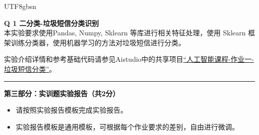 \documentclass[a4paper, 11pt]{article}
\newenvironment{problem}[2][Q]
    { \begin{mdframed}[backgroundcolor=gray!20] \textbf{#1 #2} \\}
    {  \end{mdframed}}
\begin{document}
\begin{CJK}{UTF8}{gbsn}
\begin{problem}{1 二分类-垃圾短信分类识别}
本实验要求使用Pandas, Numpy, Sklearn 等库进行相关特征处理，使用 Sklearn 框架训练分类器，使用机器学习的方法对垃圾短信进行分类。

实验介绍详情和参考基础代码请参见Aistudio中的共享项目\href{https://aistudio.baidu.com/studio/project/partial/verify/7582660/d72871e3eb6146cfb4d9fdafa4ca3116}{“人工智能课程-作业一-垃圾短信分类”}。

\end{problem}

\noindent\rule{7in}{1pt}
\textbf{第三部分：实训题实验报告（共2分）}
\begin{itemize}
    \item 请按照实验报告模板完成实验报告。
    \item 实验报告模板是通用模板，可根据每个作业要求的差别，自由进行微调。
\end{itemize}

\end{CJK}
\end{document}

